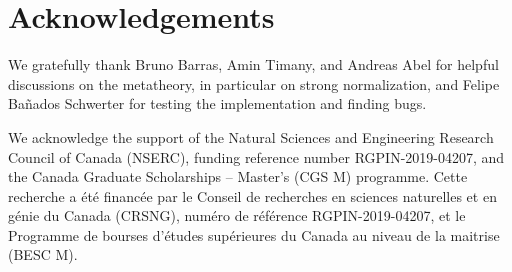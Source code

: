 \section*{Acknowledgements}

We gratefully thank Bruno Barras, Amin Timany, and Andreas Abel for helpful discussions on the metatheory,
in particular on strong normalization,
and Felipe Ba\~nados Schwerter for testing the implementation and finding bugs.

We acknowledge the support of the Natural Sciences and Engineering Research Council of Canada (NSERC), funding reference number RGPIN-2019-04207,
and the Canada Graduate Scholarships -- Master’s (CGS M) programme.
Cette recherche a \'et\'e financ\'ee par le Conseil de recherches en sciences naturelles et en g\'enie du Canada (CRSNG), num\'ero de r\'ef\'erence RGPIN-2019-04207,
et le Programme de bourses d’\'etudes sup\'erieures du Canada au niveau de la maitrise (BESC M).
